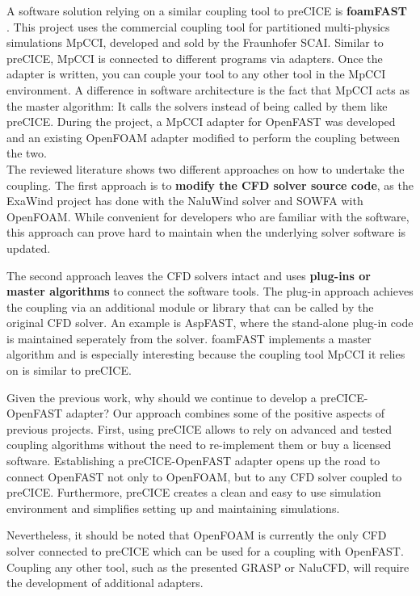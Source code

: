 A software solution relying on a similar coupling tool to preCICE is \textbf{foamFAST} \cite{Weber:2017}. This project uses the commercial coupling tool for partitioned multi-physics simulations MpCCI, developed and sold by the Fraunhofer SCAI. Similar to preCICE, MpCCI is connected to different programs via adapters. Once the adapter is written, you can couple your tool to any other tool in the MpCCI environment. A difference in software architecture is the fact that MpCCI acts as the master algorithm: It calls the solvers instead of being called by them like preCICE. During the project, a MpCCI adapter for OpenFAST was developed and an existing OpenFOAM adapter modified to perform the coupling between the two.\\

The reviewed literature shows two different approaches on how to undertake the coupling. The first approach is to \textbf{modify the CFD solver source code}, as the ExaWind project has done with the NaluWind solver and SOWFA with OpenFOAM. While convenient for developers who are familiar with the software, this approach can prove hard to maintain when the underlying solver software is updated.

The second approach leaves the CFD solvers intact and uses \textbf{plug-ins or master algorithms} to connect the software tools. The plug-in approach achieves the coupling via an additional module or library that can be called by the original CFD solver. An example is AspFAST, where the stand-alone plug-in code is maintained seperately from the solver. foamFAST implements a master algorithm and is especially interesting because the coupling tool MpCCI it relies on is similar to preCICE.

Given the previous work, why should we continue to develop a preCICE-OpenFAST adapter?
Our approach combines some of the positive aspects of previous projects. First, using preCICE allows to rely on advanced and tested coupling algorithms without the need to re-implement them or buy a licensed software. Establishing a preCICE-OpenFAST adapter opens up the road to connect OpenFAST not only to OpenFOAM, but to any CFD solver coupled to preCICE. Furthermore, preCICE creates a clean and easy to use simulation environment and simplifies setting up and maintaining simulations.

Nevertheless, it should be noted that OpenFOAM is currently the only CFD solver connected to preCICE which can be used for a coupling with OpenFAST. Coupling any other tool, such as the presented GRASP or NaluCFD, will require the development of additional adapters.

